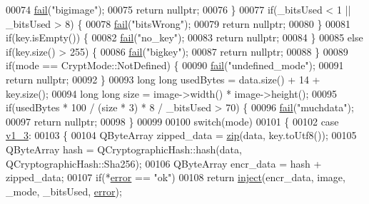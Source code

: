 \begin{DoxyCode}
00074         \hyperlink{class_model_p_c_a47464b59b7e37fcee25e55475708aabd}{fail}(\textcolor{stringliteral}{"bigimage"});
00075         \textcolor{keywordflow}{return} \textcolor{keyword}{nullptr};
00076     \}
00077     \textcolor{keywordflow}{if}(\_bitsUsed < 1 || \_bitsUsed > 8) \{
00078         \hyperlink{class_model_p_c_a47464b59b7e37fcee25e55475708aabd}{fail}(\textcolor{stringliteral}{"bitsWrong"});
00079         \textcolor{keywordflow}{return} \textcolor{keyword}{nullptr};
00080     \}
00081     \textcolor{keywordflow}{if}(key.isEmpty()) \{
00082         \hyperlink{class_model_p_c_a47464b59b7e37fcee25e55475708aabd}{fail}(\textcolor{stringliteral}{"no\_key"});
00083         \textcolor{keywordflow}{return} \textcolor{keyword}{nullptr};
00084     \}
00085     \textcolor{keywordflow}{else} \textcolor{keywordflow}{if}(key.size() > 255) \{
00086         \hyperlink{class_model_p_c_a47464b59b7e37fcee25e55475708aabd}{fail}(\textcolor{stringliteral}{"bigkey"});
00087         \textcolor{keywordflow}{return} \textcolor{keyword}{nullptr};
00088     \}
00089     \textcolor{keywordflow}{if}(mode == CryptMode::NotDefined) \{
00090         \hyperlink{class_model_p_c_a47464b59b7e37fcee25e55475708aabd}{fail}(\textcolor{stringliteral}{"undefined\_mode"});
00091         \textcolor{keywordflow}{return} \textcolor{keyword}{nullptr};
00092     \}
00093     \textcolor{keywordtype}{long} \textcolor{keywordtype}{long} usedBytes = data.size() + 14 + key.size();
00094     \textcolor{keywordtype}{long} \textcolor{keywordtype}{long} size = image->width() * image->height();
00095     \textcolor{keywordflow}{if}(usedBytes * 100 / (size * 3) * 8 / \_bitsUsed > 70) \{
00096         \hyperlink{class_model_p_c_a47464b59b7e37fcee25e55475708aabd}{fail}(\textcolor{stringliteral}{"muchdata"});
00097         \textcolor{keywordflow}{return} \textcolor{keyword}{nullptr};
00098     \}
00099 
00100     \textcolor{keywordflow}{switch}(mode)
00101     \{
00102         \textcolor{keywordflow}{case} \hyperlink{class_model_p_c_a296dd7afe3e1c49b3da25fd644fe4ceba7612e38de7178170655a56ddcf96e12c}{v1\_3}:
00103         \{
00104             QByteArray zipped\_data = \hyperlink{class_model_p_c_afebbbfa4b07deba4f68fc6dfb50f353f}{zip}(data, key.toUtf8());
00105             QByteArray hash = QCryptographicHash::hash(data, QCryptographicHash::Sha256);
00106             QByteArray encr\_data = hash + zipped\_data;
00107             \textcolor{keywordflow}{if}(*\hyperlink{class_model_p_c_a4e5a9c0ca1f06fe5bc478b6bf248c37c}{error} == \textcolor{stringliteral}{"ok"})
00108                 \textcolor{keywordflow}{return} \hyperlink{class_model_p_c_aada6a04d81ada8f2b4ba18108c8d6f10}{inject}(encr\_data, image, \_mode, \_bitsUsed, \hyperlink{class_model_p_c_a4e5a9c0ca1f06fe5bc478b6bf248c37c}{error});

\end{DoxyCode}
